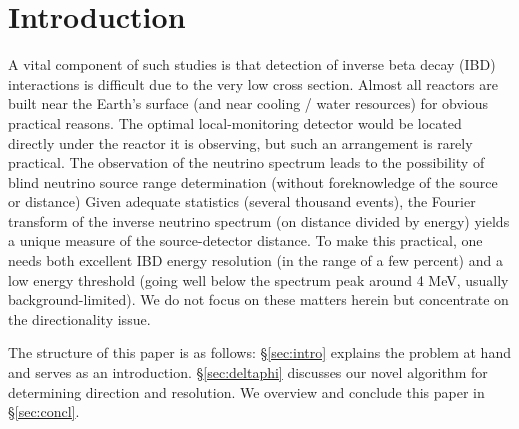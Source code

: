 \section{\label{sec:intro}Introduction}

A vital component of such studies is that detection of inverse beta decay (IBD) interactions is difficult due to the very low cross section. %
Almost all reactors are built near the Earth's surface (and near cooling / water resources) for obvious practical reasons.
The optimal local-monitoring detector would be located directly under the reactor it is observing, but such an arrangement is rarely practical.
The observation of the neutrino spectrum leads to the possibility of blind neutrino source range determination (without foreknowledge of the source or distance) \cite{Smith:2010zzb} \cite{Snowmass:2021}
Given adequate statistics (several thousand events), the Fourier transform of the inverse neutrino spectrum (on distance divided by energy) yields a unique measure of the source-detector distance.
To make this practical, one needs both excellent IBD energy resolution (in the range of a few percent) and a low energy threshold (going well below the spectrum peak around 4 MeV, usually background-limited). \cite{Jocher:2013gta}
We do not focus on these matters herein but concentrate on the directionality issue.

The structure of this paper is as follows: 
\S\ref{sec:intro} explains the problem at hand and serves as an introduction.
\S\ref{sec:deltaphi} discusses our novel algorithm for determining direction and resolution.
We overview and conclude this paper in \S\ref{sec:concl}.
